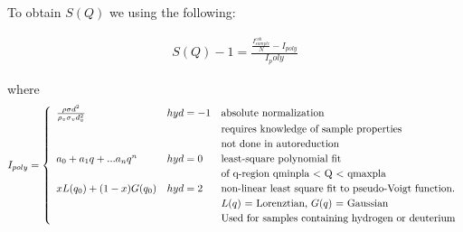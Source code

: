 To obtain $S(Q)$ we using the following:

\begin{equation} \label{eq_reduction}
\begin{split}
S(Q) - 1 = \frac{\frac{I_{sample}^{coh}}{N} - I_{poly}}{I_poly}
\end{split}
\end{equation}


where 
\begin{equation*} \label{eq_reduction}
I_{poly} = 
	\renewcommand{\arraystretch}{1.2}
    \left\{\begin{array}{l @{\quad} l l l}

      		\frac{\rho \sigma d^2}{\rho_v \sigma_v d^2_v} & hyd = -1 & \text{absolute normalization} \\ 
      		{}                                            & {}       & \text{requires knowledge of sample properties} \\
      		{}                                            &          & \text{not done in autoreduction} \\
      		a_0 + a_1 q + ... a_nq^n                      & hyd = 0  & \text{least-square polynomial fit} \\
      		{}                                            & {}       & \text{of q-region qminpla $<$ Q $<$ qmaxpla} \\
      		xL(q_0) + (1-x) G(q_0)                        & hyd = 2  & \text{non-linear least square fit to
pseudo-Voigt function.} \\
			{}											  & {}       & \text{$L(q)$ = Lorenztian, $G(q)$ = Gaussian } \\
      		{}                                            & {}       & \text{Used for samples containing hydrogen or deuterium} \\
	\end{array}\right.
\end{equation*}		

 
